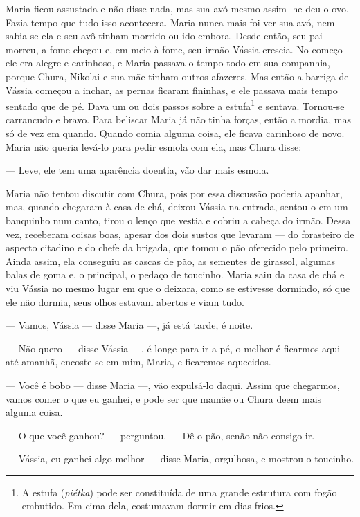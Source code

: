 Maria ficou assustada e não disse nada, mas sua avó mesmo assim lhe deu
o ovo. Fazia tempo que tudo isso acontecera. Maria nunca mais foi ver
sua avó, nem sabia se ela e seu avô tinham morrido ou ido embora. Desde
então, seu pai morreu, a fome chegou e, em meio à fome, seu irmão Vássia
crescia. No começo ele era alegre e carinhoso, e Maria passava o tempo
todo em sua companhia, porque Chura, Nikolai e sua mãe tinham outros
afazeres. Mas então a barriga de Vássia começou a inchar, as pernas
ficaram fininhas, e ele passava mais tempo sentado que de pé. Dava um ou
dois passos sobre a estufa\footnote{A estufa (\emph{piétka}) pode ser
  constituída de uma grande estrutura com fogão embutido. Em cima dela,
  costumavam dormir em dias frios.} e sentava. Tornou-se carrancudo e
bravo. Para beliscar Maria já não tinha forças, então a mordia, mas só
de vez em quando. Quando comia alguma coisa, ele ficava carinhoso de
novo. Maria não queria levá-lo para pedir esmola com ela, mas Chura
disse:

--- Leve, ele tem uma aparência doentia, vão dar mais esmola.

Maria não tentou discutir com Chura, pois por essa discussão poderia
apanhar, mas, quando chegaram à casa de chá, deixou Vássia na entrada,
sentou-o em um banquinho num canto, tirou o lenço que vestia e cobriu a
cabeça do irmão. Dessa vez, receberam coisas boas, apesar dos dois
sustos que levaram --- do forasteiro de aspecto citadino e do chefe da
brigada, que tomou o pão oferecido pelo primeiro. Ainda assim, ela
conseguiu as cascas de pão, as sementes de girassol, algumas balas de
goma e, o principal, o pedaço de toucinho. Maria saiu da casa de chá e
viu Vássia no mesmo lugar em que o deixara, como se estivesse dormindo,
só que ele não dormia, seus olhos estavam abertos e viam tudo.

--- Vamos, Vássia --- disse Maria ---, já está tarde, é noite.

--- Não quero --- disse Vássia ---, é longe para ir a pé, o melhor é
ficarmos aqui até amanhã, encoste-se em mim, Maria, e ficaremos
aquecidos.

--- Você é bobo --- disse Maria ---, vão expulsá-lo daqui. Assim que
chegarmos, vamos comer o que eu ganhei, e pode ser que mamãe ou Chura
deem mais alguma coisa.

--- O que você ganhou? --- perguntou. --- Dê o pão, senão não consigo
ir.

--- Vássia, eu ganhei algo melhor --- disse Maria, orgulhosa, e mostrou
o toucinho.

